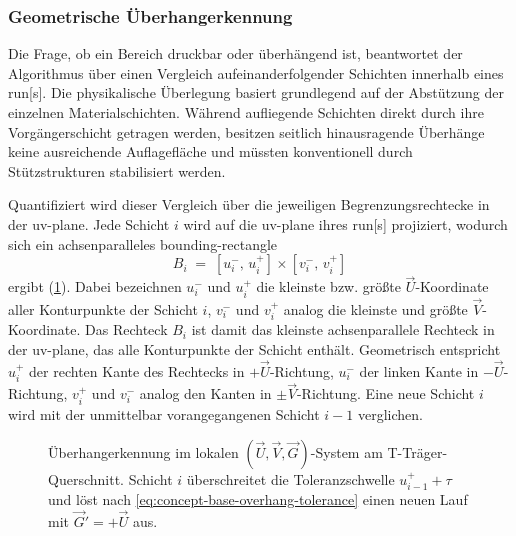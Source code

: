             \subsubsection{Geometrische Überhangerkennung}\label{subsubsec:concept-base-overhang-detection} 
                Die Frage, ob ein Bereich druckbar oder überhängend ist, beantwortet der Algorithmus über einen Vergleich aufeinanderfolgender Schichten innerhalb eines \gls{run}[s].
                Die physikalische Überlegung basiert grundlegend auf der Abstützung der einzelnen Materialschichten.
                Während aufliegende Schichten direkt durch ihre Vorgängerschicht getragen werden, besitzen seitlich hinausragende Überhänge keine ausreichende Auflagefläche und müssten konventionell durch Stützstrukturen stabilisiert werden.

                Quantifiziert wird dieser Vergleich über die jeweiligen Begrenzungsrechtecke in der \gls{uv-plane}.
                Jede Schicht $i$ wird auf die \gls{uv-plane} ihres \gls{run}[s] projiziert, wodurch sich ein achsenparalleles \gls{bounding-rectangle}
                \[
                    B_i \;=\; [u^-_i,\, u^+_i] \times [v^-_i,\, v^+_i]
                \]
                ergibt (\cref{fig:concept-base-overhang}).
                Dabei bezeichnen $u^-_i$ und $u^+_i$ die kleinste bzw. größte $\vec{U}$-Koordinate aller Konturpunkte der Schicht $i$, $v^-_i$ und $v^+_i$ analog die kleinste und größte $\vec{V}$-Koordinate.
                Das Rechteck $B_i$ ist damit das kleinste achsenparallele Rechteck in der \gls{uv-plane}, das alle Konturpunkte der Schicht enthält.
                Geometrisch entspricht $u^+_i$ der rechten Kante des Rechtecks in $+\vec{U}$-Richtung, $u^-_i$ der linken Kante in $-\vec{U}$-Richtung, $v^+_i$ und $v^-_i$ analog den Kanten in $\pm\vec{V}$-Richtung.
                Eine neue Schicht $i$ wird mit der unmittelbar vorangegangenen Schicht $i-1$ verglichen.

                \begin{figure}[ht]
                    \centering
                    
                    \caption[Geometrische Überhangerkennung im UV-G-System]{
                        Überhangerkennung im lokalen $(\vec{U}, \vec{V}, \vec{G})$-System am T-Träger-Querschnitt.
                        Schicht $i$ überschreitet die Toleranzschwelle $u^+_{i-1} + \tau$ und löst nach \cref{eq:concept-base-overhang-tolerance} einen neuen Lauf mit $\vec{G}' = +\vec{U}$ aus.
                    }
                    \label{fig:concept-base-overhang}
                \end{figure}

